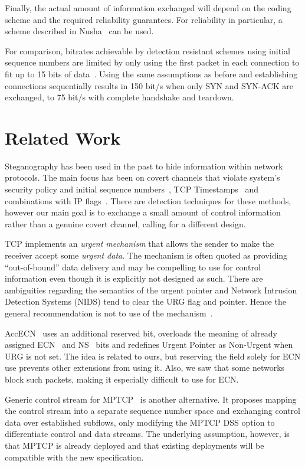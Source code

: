 \documentclass{sig-alternate-10pt}
\begin{document}
Finally, the actual amount of information exchanged will depend on the coding scheme and the required reliability guarantees. For reliability in particular, a scheme described in Nusha~\cite{Rutkowska:2004ul} can be used.

For comparison, bitrates achievable by detection resistant schemes using initial sequence numbers are limited by only using the first packet in each connection to fit up to 15 bits of data~\cite{Murdoch:2005fz}. Using the same assumptions as before and establishing connections sequentially results in 150 bit/s when only SYN and SYN-ACK are exchanged, to 75 bit/s with complete handshake and teardown.

\section{Related Work}
\label{sec:related}

Steganography has been used in the past to hide information within network protocols. The main focus has been on covert channels that violate system's security policy and initial sequence numbers~\cite{Rowland:1997vq}, TCP Timestamps~\cite{Giffin:2002wh} and combinations with IP flags~\cite{Murdoch:2005fz}. There are detection techniques for these methods, however our main goal is to exchange a small amount of control information rather than a genuine covert channel, calling for a different design.

TCP implements an \emph{urgent mechanism} that allows the sender to make the receiver accept some \emph{urgent data}. The mechanism is often quoted as providing ``out-of-bound'' data delivery and may be compelling to use for control information even though it is explicitly not designed as such. There are ambiguities regarding the semantics of the urgent pointer and Network Intrusion Detection Systems (NIDS) tend to clear the URG flag and pointer. Hence the general recommendation is not to use of the mechanism~\cite{Gont:2011vi}.

AccECN~\cite{Kuhlewind:2014vd} uses an additional reserved bit, overloads the meaning of already assigned ECN~\cite{Floyd:up} and NS~\cite{Ely:uc} bits and redefines Urgent Pointer as Non-Urgent when URG is not set. The idea is related to ours, but reserving the field solely for ECN use prevents other extensions from using it. Also, we saw that some networks block such packets, making it especially difficult to use for ECN.

Generic control stream for MPTCP~\cite{Bonaventure:wx} is another alternative. It proposes mapping the control stream into a separate sequence number space and exchanging control data over established subflows, only modifying the MPTCP DSS option to differentiate control and data streams. The underlying assumption, however, is that MPTCP is already deployed and that existing deployments will be compatible with the new specification.
\end{document}
